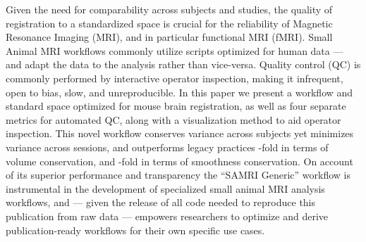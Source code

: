 Given the need for comparability across subjects and studies, the quality of registration to a standardized space is crucial for the reliability of Magnetic Resonance Imaging (MRI), and in particular functional MRI (fMRI).
Small Animal MRI workflows commonly utilize scripts optimized for human data --- and adapt the data to the analysis rather than vice-versa.
Quality control (QC) is commonly performed by interactive operator inspection, making it infrequent, open to bias, slow, and unreproducible.
In this paper we present a workflow and standard space optimized for mouse brain registration, as well as four separate metrics for automated QC, along with a visualization method to aid operator inspection.
This novel workflow conserves variance across subjects yet minimizes variance across sessions, and outperforms legacy practices
-fold in terms of volume conservation,
and -fold in terms of smoothness conservation.
On account of its superior performance and transparency the “SAMRI Generic” workflow is instrumental in the development of specialized small animal MRI analysis workflows, and --- given the release of all code needed to reproduce this publication from raw data --- empowers researchers to optimize and derive publication-ready workflows for their own specific use cases.
